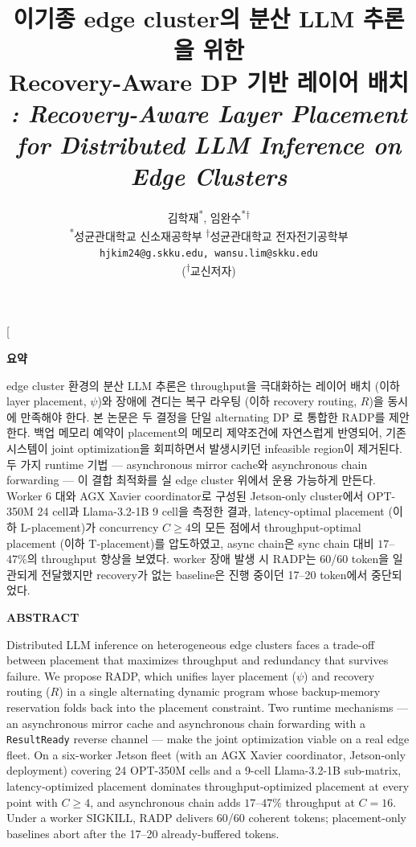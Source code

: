\documentclass[10pt,twocolumn,a4paper]{article}
\title{%
  \vspace{-2em}%
  이기종 edge cluster의 분산 LLM 추론을 위한\\
  Recovery-Aware DP 기반 레이어 배치\\
  \vspace{0.3em}%
  \large \mdseries\textit{%
    \sys{}: Recovery-Aware Layer Placement\\
    for Distributed LLM Inference on Edge Clusters%
  }%
}
\author{%
  김학재\textsuperscript{*}, 임완수\textsuperscript{*$\dagger$}\\[0.3em]
  \small\normalfont
  \textsuperscript{*}성균관대학교 신소재공학부 \quad
  \textsuperscript{$\dagger$}성균관대학교 전자전기공학부\\
  \texttt{hjkim24@g.skku.edu, wansu.lim@skku.edu}\\[-0.5em]
  \small{(\textsuperscript{$\dagger$}교신저자)}
}
\date{}
\newcommand{\sys}{RADP}
\begin{document}
\twocolumn[%
  \begin{@twocolumnfalse}
  \maketitle
  \begin{center}
    \begin{minipage}{0.92\textwidth}
      \small

      \noindent\textbf{요\quad 약}

       edge cluster 환경의 분산 LLM 추론은
      throughput을 극대화하는 레이어 배치 (이하 layer placement, $\psi$)와
      장애에 견디는 복구 라우팅 (이하 recovery routing, $R$)을
      동시에 만족해야 한다. 본 논문은 두 결정을 단일 alternating DP
      로 통합한 \sys{}를 제안한다. 백업 메모리 예약이 placement의
      메모리 제약조건에 자연스럽게 반영되어,
      기존 시스템이 joint optimization을 회피하면서 발생시키던
      infeasible region이 제거된다. 두 가지 runtime 기법 ---
      asynchronous mirror cache와 asynchronous chain forwarding ---
      이 결합 최적화를 실 edge cluster 위에서 운용 가능하게 만든다.
      Worker 6 대와 AGX Xavier coordinator로 구성된 Jetson-only
      cluster에서 OPT-350M 24 cell과 Llama-3.2-1B
      9 cell을 측정한 결과, latency-optimal placement (이하 L-placement)가
      concurrency $C\!\geq\!4$의 모든 점에서 throughput-optimal placement
      (이하 T-placement)를 압도하였고, async chain은 sync chain 대비
      $17$--$47\%$의 throughput 향상을 보였다. worker 장애 발생 시
      \sys{}는 60/60 token을 일관되게 전달했지만 recovery가 없는
      baseline은 진행 중이던 17--20 token에서 중단되었다.

      \vspace{0.4em}
      \noindent\textbf{ABSTRACT}

      \noindent Distributed LLM inference on heterogeneous edge clusters
      faces a trade-off between placement that maximizes throughput and
      redundancy that survives failure. We propose \sys{}, which unifies
      layer placement ($\psi$) and recovery routing ($R$) in a single
      alternating dynamic program whose backup-memory reservation folds
      back into the placement constraint. Two runtime mechanisms ---
      an asynchronous mirror cache and asynchronous chain forwarding
      with a \texttt{ResultReady} reverse channel --- make the joint
      optimization viable on a real edge fleet. On a six-worker
      Jetson fleet (with an AGX Xavier coordinator, Jetson-only
      deployment) covering 24 OPT-350M cells and a 9-cell
      Llama-3.2-1B sub-matrix, latency-optimized placement dominates
      throughput-optimized placement at every point with $C\!\geq\!4$,
      and asynchronous chain adds $17$--$47\%$ throughput at $C\!=\!16$.
      Under a worker SIGKILL, \sys{} delivers 60/60 coherent tokens;
      placement-only baselines abort after the 17--20 already-buffered
      tokens.


\end{minipage}
\end{center}
\end{@twocolumnfalse}
\end{document}

